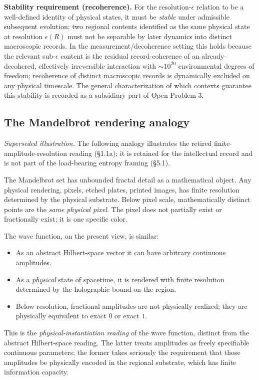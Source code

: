 \documentclass[11pt,a4paper]{article}
\begin{document}
\textbf{Stability requirement (recoherence).} For the resolution-$\epsilon$ relation to be a well-defined identity of physical states, it must be \emph{stable} under admissible subsequent evolution: two regional contents identified as the same physical state at resolution $\epsilon(R)$ must not be separable by later dynamics into distinct macroscopic records. In the measurement/decoherence setting this holds because the relevant sub-$\epsilon$ content is the residual record-coherence of an already-decohered, effectively irreversible interaction with $\sim 10^{20}$ environmental degrees of freedom; recoherence of distinct macroscopic records is dynamically excluded on any physical timescale. The general characterization of which contexts guarantee this stability is recorded as a subsidiary part of Open Problem 3.

\subsection{The Mandelbrot rendering analogy}

\emph{Superseded illustration.} The following analogy illustrates the retired finite-amplitude-resolution reading (§1.1a); it is retained for the intellectual record and is not part of the load-bearing entropy framing (§5.1).

The Mandelbrot set has unbounded fractal detail as a mathematical object. Any physical rendering, pixels, etched plates, printed images, has finite resolution determined by the physical substrate. Below pixel scale, mathematically distinct points are the \emph{same physical pixel}. The pixel does not partially exist or fractionally exist; it is one specific color.

The wave function, on the present view, is similar:
\begin{itemize}
  \item As an abstract Hilbert-space vector it can have arbitrary continuous amplitudes.
  \item As a \emph{physical} state of spacetime, it is rendered with finite resolution determined by the holographic bound on the region.
  \item Below resolution, fractional amplitudes are not physically realized; they are physically equivalent to exact $0$ or exact $1$.
\end{itemize}

This is the \emph{physical-instantiation reading} of the wave function, distinct from the abstract Hilbert-space reading. The latter treats amplitudes as freely specifiable continuous parameters; the former takes seriously the requirement that those amplitudes be physically encoded in the regional substrate, which has finite information capacity.
\end{document}
